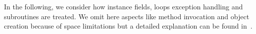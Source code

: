 %
%





In the following, we consider how instance fields, %
loops exception handling and subroutines are treated. We omit here aspects like method invocation and object creation because of space limitations but a detailed explanation can be found in~\cite{JBL05MP}. 

%





